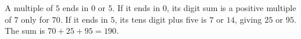 A multiple of $5$ ends in $0$ or $5$. If it ends in $0$, its digit sum is a positive multiple of $7$ only for $70$. If it ends in $5$, its tens digit plus five is $7$ or $14$, giving $25$ or $95$. The sum is $70+25+95=\boxed{190}$.
